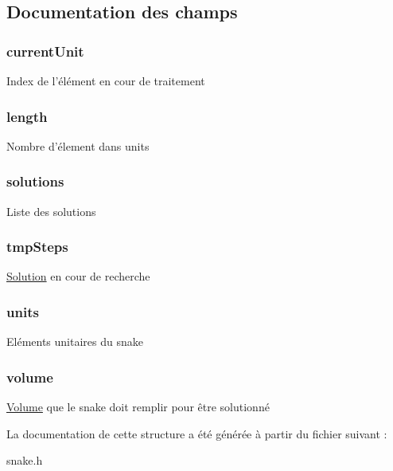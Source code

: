 \subsection{Documentation des champs}
\hypertarget{struct_snake_a1e5f8a70f50d68340f54ac884c05dcff}{
\subsubsection[{current\-Unit}]{\setlength{\rightskip}{0pt plus 5cm}current\-Unit}}\label{struct_snake_a1e5f8a70f50d68340f54ac884c05dcff}
Index de l'élément en cour de traitement \hypertarget{struct_snake_af9d495c1655d813d553030485d00fea7}{
\subsubsection[{length}]{\setlength{\rightskip}{0pt plus 5cm}length}}\label{struct_snake_af9d495c1655d813d553030485d00fea7}
Nombre d'élement dans units \hypertarget{struct_snake_a97be9d71c3998b7a3a97e9403e375979}{
\subsubsection[{solutions}]{\setlength{\rightskip}{0pt plus 5cm}solutions}}\label{struct_snake_a97be9d71c3998b7a3a97e9403e375979}
Liste des solutions \hypertarget{struct_snake_a99a4f4239fb1568fe35d9a081c9b2660}{
\subsubsection[{tmp\-Steps}]{\setlength{\rightskip}{0pt plus 5cm}tmp\-Steps}}\label{struct_snake_a99a4f4239fb1568fe35d9a081c9b2660}
\hyperlink{struct_solution}{Solution} en cour de recherche \hypertarget{struct_snake_a2ff02817760e56a95b3b1bc7cfa1b77b}{
\subsubsection[{units}]{\setlength{\rightskip}{0pt plus 5cm}units}}\label{struct_snake_a2ff02817760e56a95b3b1bc7cfa1b77b}
Eléments unitaires du snake \hypertarget{struct_snake_a9bc498ccac8db41438f855f5dd3f4c05}{
\subsubsection[{volume}]{\setlength{\rightskip}{0pt plus 5cm}volume}}\label{struct_snake_a9bc498ccac8db41438f855f5dd3f4c05}
\hyperlink{struct_volume}{Volume} que le snake doit remplir pour être solutionné 

La documentation de cette structure a été générée à partir du fichier suivant \-:\begin{DoxyCompactItemize}
\item 
snake.\-h\end{DoxyCompactItemize}
